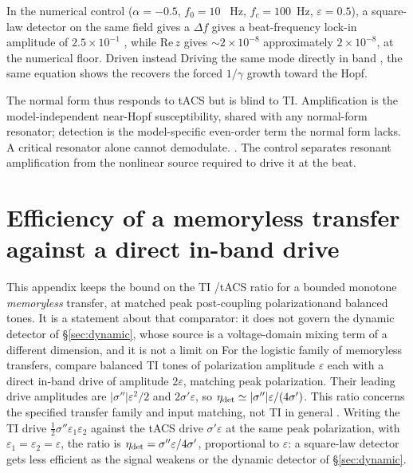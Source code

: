 \documentclass[11pt,a4paper]{article}
\newcommand{\Sig}{\sigma}
\newcommand{\half}{\tfrac{1}{2}}
\providecommand{\DIFaddtex}[1]{{\protect\color{blue} \sf #1}} %
\providecommand{\DIFdeltex}[1]{{\protect\color{red} \scriptsize #1}} %
\providecommand{\DIFaddbegin}{} %
\providecommand{\DIFaddend}{} %
\providecommand{\DIFdelbegin}{} %
\providecommand{\DIFdelend}{} %
\providecommand{\DIFadd}[1]{\texorpdfstring{\DIFaddtex{#1}}{#1}} %
\providecommand{\DIFdel}[1]{\texorpdfstring{\DIFdeltex{#1}}{}} %
\begin{document}
\DIFadd{In the numerical control }\DIFaddend ($\alpha=-0.5$, $f_0=10$\DIFaddbegin \DIFadd{~Hz}\DIFaddend , $f_c=100$~Hz,
$\varepsilon=0.5$), a square-law detector \DIFdelbegin \DIFdel{on the same field gives a $\Delta f$ }\DIFdelend \DIFaddbegin \DIFadd{gives a beat-frequency }\DIFaddend lock-in \DIFaddbegin \DIFadd{amplitude
}\DIFaddend of $2.5\times10^{-1}$\DIFaddbegin \DIFadd{, }\DIFaddend while $\mathrm{Re}\,z$ gives \DIFdelbegin \DIFdel{$\sim 2\times10^{-8}$}\DIFdelend \DIFaddbegin \DIFadd{approximately
$2\times10^{-8}$}\DIFaddend , at the numerical floor. \DIFdelbegin \DIFdel{Driven instead
}\DIFdelend \DIFaddbegin \DIFadd{Driving the same mode }\DIFaddend directly in band
\DIFdelbegin \DIFdel{, the same equation shows the }\DIFdelend \DIFaddbegin \DIFadd{recovers the }\DIFaddend forced $1/\gamma$ growth\DIFdelbegin \DIFdel{toward the Hopf. }%

\DIFdel{The normal form thus responds to tACS but is blind to TI. Amplification is the model-independent near-Hopf susceptibility, shared with any normal-form resonator;
detection is the model-specific even-order term the normal form lacks.
A critical
resonator alone cannot demodulate.
}\DIFdelend \DIFaddbegin \DIFadd{. The control separates resonant amplification
from the nonlinear source required to drive it at the beat.
}\DIFaddend

\section{Efficiency of a memoryless transfer against a direct in-band drive}\label{app:bound}
\DIFdelbegin \DIFdel{This appendix keeps the bound on the TI /tACS ratio for a bounded monotone \emph{memoryless}
transfer, at matched peak post-coupling polarizationand balanced tones.
It is a statement
about that comparator: it does not govern the dynamic detector of \S\ref{sec:dynamic},
whose source is a voltage-domain mixing term of a different dimension, and it is not a
limit on }\DIFdelend \DIFaddbegin \DIFadd{For the logistic family of memoryless transfers, compare balanced TI tones of
polarization amplitude $\varepsilon$ each with a direct in-band drive of amplitude
$2\varepsilon$, matching peak polarization. Their leading drive amplitudes are
$|\Sig''|\varepsilon^2/2$ and $2\Sig'\varepsilon$, so
$\eta_{\rm det}\simeq|\Sig''|\varepsilon/(4\Sig')$.
This ratio concerns the specified transfer family and input matching, not }\DIFaddend TI in
general \DIFdelbegin \DIFdel{. Writing the TI drive $\half\Sig''\varepsilon_1\varepsilon_2$
against the tACS drive $\Sig'\varepsilon$ at the same peak polarization, with
$\varepsilon_1=\varepsilon_2=\varepsilon$, the ratio is
$\eta_{\rm det}=\Sig''\varepsilon/4\Sig'$, proportional to $\varepsilon$: a square-law
detector gets less efficient as the signal weakens}\DIFdelend \DIFaddbegin \DIFadd{or the dynamic detector of \S\ref{sec:dynamic}}\DIFaddend .
\end{document}
